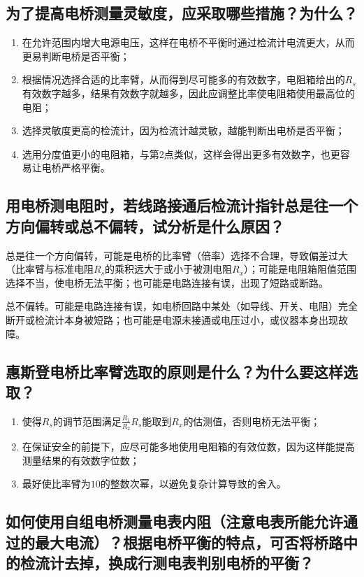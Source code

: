\documentclass[]{../template/Report}%
\begin{document}
\begin{fullreportonly}
    \subsection{为了提高电桥测量灵敏度，应采取哪些措施？为什么？}
    \begin{enumerate}
        \item 在允许范围内增大电源电压，这样在电桥不平衡时通过检流计电流更大，从而更易判断电桥是否平衡；
        \item 根据情况选择合适的比率臂，从而得到尽可能多的有效数字，电阻箱给出的$R_s$有效数字越多，结果有效数字就越多，因此应调整比率使电阻箱使用最高位的电阻；
        \item 选择灵敏度更高的检流计，因为检流计越灵敏，越能判断出电桥是否平衡；
        \item 选用分度值更小的电阻箱，与第2点类似，这样会得出更多有效数字，也更容易让电桥严格平衡。
    \end{enumerate}
    \subsection{用电桥测电阻时，若线路接通后检流计指针总是往一个方向偏转或总不偏转，试分析是什么原因？}
    总是往一个方向偏转，可能是电桥的比率臂（倍率）选择不合理，导致偏差过大（比率臂与标准电阻$R_s$的乘积远大于或小于被测电阻$R_x$）；可能是电阻箱阻值范围选择不当，使电桥无法平衡；也可能是电路连接有误，出现了短路或断路。

    总不偏转。可能是电路连接有误，如电桥回路中某处（如导线、开关、电阻）完全断开或检流计本身被短路；也可能是电源未接通或电压过小，或仪器本身出现故障。
    \subsection{惠斯登电桥比率臂选取的原则是什么？为什么要这样选取？}
    \begin{enumerate}
        \item 使得$R_s$的调节范围满足$\frac{R_1}{R_2}R_s$能取到$R_x$的估测值，否则电桥无法平衡；
        \item 在保证安全的前提下，应尽可能多地使用电阻箱的有效位数，因为这样能提高测量结果的有效数字位数；
        \item 最好使比率臂为$10$的整数次幂，以避免复杂计算导致的舍入。
    \end{enumerate}


    \subsection{如何使用自组电桥测量电表内阻（注意电表所能允许通过的最大电流）？根据电桥平衡的特点，可否将桥路中的检流计去掉，换成行测电表判别电桥的平衡？}


\end{fullreportonly}
\end{document}
